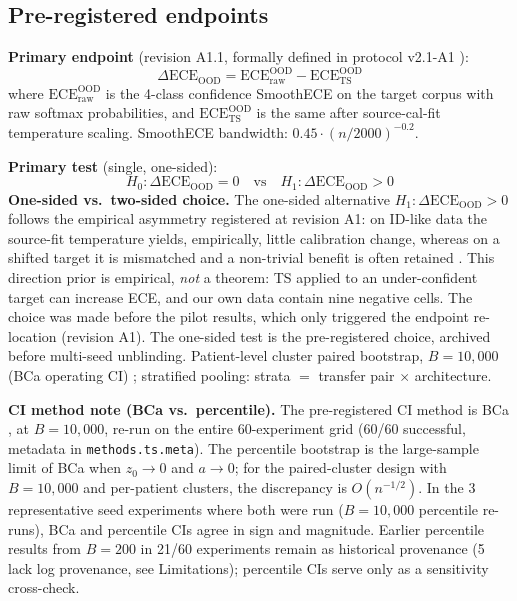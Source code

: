 \documentclass[review,12pt,nonatbib]{elsarticle}
\begin{document}
\subsection{Pre-registered endpoints}
\label{sec:prereg}
\textbf{Primary endpoint} (revision A1.1, formally defined in
protocol v2.1-A1 \cite{protocolv21a1}):
\begin{equation}
    \Delta\text{ECE}_{\text{OOD}}
    = \text{ECE}_{\mathrm{raw}}^{\mathrm{OOD}} - \text{ECE}_{\mathrm{TS}}^{\mathrm{OOD}}
\end{equation}
where $\text{ECE}_{\mathrm{raw}}^{\mathrm{OOD}}$ is the 4-class confidence SmoothECE on
the target corpus with raw softmax probabilities, and
$\text{ECE}_{\mathrm{TS}}^{\mathrm{OOD}}$ is the same after source-cal-fit temperature
scaling. SmoothECE bandwidth: $0.45\cdot(n/2000)^{-0.2}$.

\textbf{Primary test} (single, one-sided):
\begin{equation}
    H_0: \Delta\text{ECE}_{\text{OOD}} = 0
    \quad\text{vs}\quad
    H_1: \Delta\text{ECE}_{\text{OOD}} > 0
\end{equation}
\textbf{One-sided vs.\ two-sided choice.} The one-sided alternative
$H_1: \Delta\text{ECE}_{\text{OOD}} > 0$ follows the empirical
asymmetry registered at revision A1: on ID-like data the source-fit
temperature yields, empirically, little calibration change, whereas
on a shifted target it is mismatched and a non-trivial benefit is
often retained \cite{guo2017calibration,ovadia2019calibration}. This
direction prior is empirical, \emph{not} a theorem: TS applied to an
under-confident target can increase ECE, and our own data contain
nine negative cells. The choice was made before the pilot results,
which only triggered the endpoint re-location (revision A1). The
one-sided test is the pre-registered choice, archived before
multi-seed unblinding.
Patient-level cluster paired bootstrap, $B=10{,}000$ (BCa
operating CI) \cite{efron1987bca}; stratified pooling: strata $=$ transfer pair
$\times$ architecture.

\textbf{CI method note (BCa vs.\ percentile).} The pre-registered
CI method is BCa \cite{efron1987bca}, at $B=10{,}000$,
re-run on the entire 60-experiment grid (60/60 successful, metadata
in \texttt{methods.ts.meta}). The percentile bootstrap is the
large-sample limit of BCa when $z_0\to 0$ and $a\to 0$; for the
paired-cluster design with $B=10{,}000$ and per-patient clusters,
the discrepancy is $O(n^{-1/2})$. In the 3 representative seed
experiments where both were run ($B=10{,}000$ percentile re-runs),
BCa and percentile CIs agree in sign and magnitude. Earlier
percentile results from $B=200$ in 21/60 experiments remain as
historical provenance (5 lack log provenance, see Limitations);
percentile CIs serve only as a sensitivity cross-check.
\end{document}
